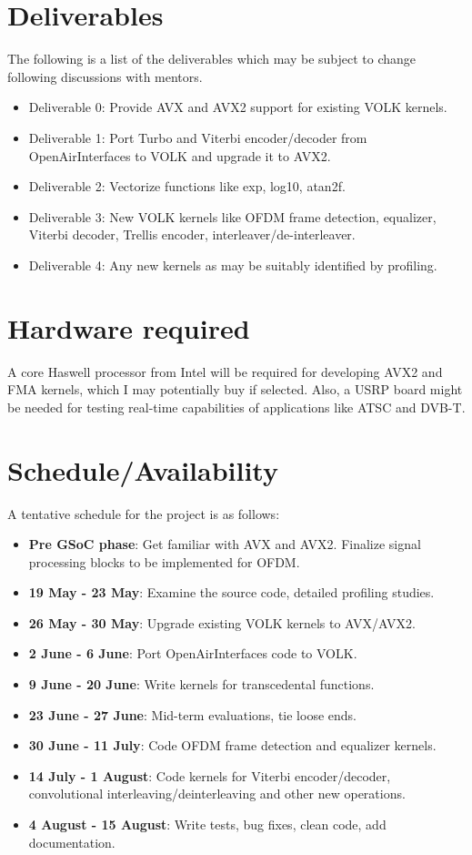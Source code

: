 \documentclass[a4paper,12pt,oneside]{article}
\begin{document}
\section{Deliverables}
The following is a list of the deliverables which may be subject to change following discussions with mentors. 

\begin{itemize}
\item Deliverable 0: Provide AVX and AVX2 support for existing VOLK kernels.
\item Deliverable 1: Port Turbo and Viterbi encoder/decoder from OpenAirInterfaces to VOLK and upgrade it to AVX2.
\item Deliverable 2: Vectorize functions like exp, log10, atan2f.
\item Deliverable 3: New VOLK kernels like OFDM frame detection, equalizer, Viterbi decoder, Trellis encoder, interleaver/de-interleaver.
\item Deliverable 4: Any new kernels as may be suitably identified by profiling.
\end{itemize}

\section{Hardware required}

A core Haswell processor from Intel will be required for developing AVX2 and FMA kernels, which I may potentially buy if selected. Also, a USRP board might be needed for testing real-time capabilities of applications like ATSC and DVB-T. 

\section{Schedule/Availability}
A tentative schedule for the project is as follows: 
\begin{itemize}
\item \textbf{Pre GSoC phase}: Get familiar with AVX and AVX2. Finalize signal processing blocks to be implemented for OFDM.  
\item \textbf{19 May - 23 May}: Examine the source code, detailed profiling studies.
\item \textbf{26 May - 30 May}: Upgrade existing VOLK kernels to AVX/AVX2.
\item \textbf{2 June - 6 June}: Port OpenAirInterfaces code to VOLK.
\item \textbf{9 June - 20 June}: Write kernels for transcedental functions.
\item \textbf{23 June - 27 June}: Mid-term evaluations, tie loose ends.
\item \textbf{30 June - 11 July}: Code OFDM frame detection and equalizer kernels.
\item \textbf{14 July - 1 August}: Code kernels for Viterbi encoder/decoder, convolutional interleaving/deinterleaving and other new operations.
\item \textbf{4 August - 15 August}: Write tests, bug fixes, clean code, add documentation.
\end{itemize}
\end{document}
